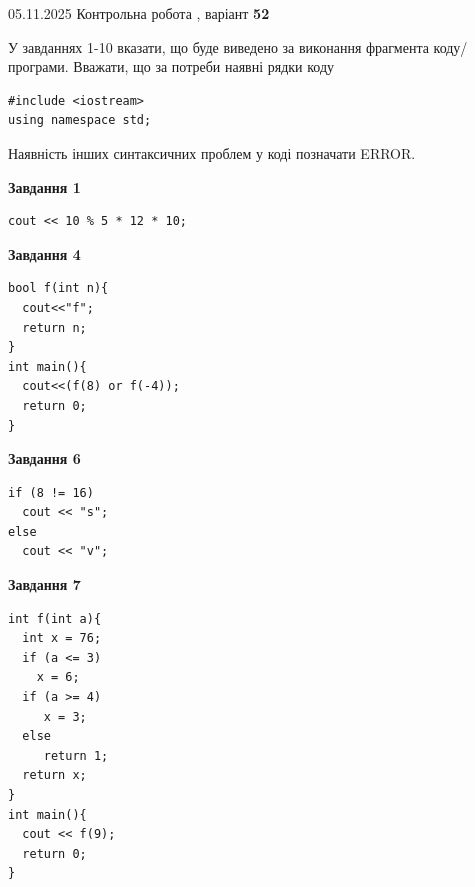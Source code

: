 \documentclass[12pt, ukrainian]{article}
\begin{document}
\newpage

{\Large{05.11.2025 Контрольна робота , варіант  \No \textbf { 52 }\par}}
{
\begin {large}
У завданнях 1-10 вказати, що буде виведено за виконання фрагмента коду/про\-гра\-ми.
Вважати, що за потреби наявні рядки коду
\begin{verbatim}
#include <iostream>
using namespace std;
\end{verbatim}
Наявність інших синтаксичних проблем у коді позначати ERROR.

\begin{minipage}[t]{7.0cm}

\begin{center}
\textbf{Завдання 1}
\end{center}
\vspace{-8mm}

\begin{verbatim}
cout << 10 % 5 * 12 * 10;
\end{verbatim}



\begin{center}
\textbf{Завдання 4}
\end{center}
\vspace{-8mm}

\begin{verbatim}
bool f(int n){
  cout<<"f";
  return n;
}
int main(){
  cout<<(f(8) or f(-4));
  return 0;
}
\end{verbatim}



\begin{center}
\textbf{Завдання 6}
\end{center}
\vspace{-8mm}

\begin{verbatim}
if (8 != 16)
  cout << "s";
else
  cout << "v";
\end{verbatim}



\begin{center}
\textbf{Завдання 7}
\end{center}
\vspace{-8mm}

\begin{verbatim}
int f(int a){
  int x = 76;
  if (a <= 3)
    x = 6;
  if (a >= 4)
     x = 3;
  else
     return 1;
  return x;
}
int main(){
  cout << f(9);
  return 0;
}
\end{verbatim}


\end{minipage}
\end{large}}
\end{document}
